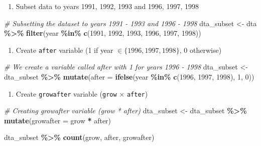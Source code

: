 \documentclass[
]{article}
\newenvironment{Shaded}{\begin{snugshade}}{\end{snugshade}}
\newcommand{\AttributeTok}[1]{\textcolor[rgb]{0.13,0.29,0.53}{#1}}
\newcommand{\CommentTok}[1]{\textcolor[rgb]{0.56,0.35,0.01}{\textit{#1}}}
\newcommand{\DecValTok}[1]{\textcolor[rgb]{0.00,0.00,0.81}{#1}}
\newcommand{\FunctionTok}[1]{\textcolor[rgb]{0.13,0.29,0.53}{\textbf{#1}}}
\newcommand{\NormalTok}[1]{#1}
\newcommand{\OtherTok}[1]{\textcolor[rgb]{0.56,0.35,0.01}{#1}}
\newcommand{\SpecialCharTok}[1]{\textcolor[rgb]{0.81,0.36,0.00}{\textbf{#1}}}
\providecommand{\tightlist}{%
  \setlength{\itemsep}{0pt}\setlength{\parskip}{0pt}}
\begin{document}
\begin{enumerate}
\def\labelenumi{\arabic{enumi}.}
\setcounter{enumi}{1}
\tightlist
\item
  Subset data to years 1991, 1992, 1993 and 1996, 1997, 1998
\end{enumerate}

\begin{Shaded}
\begin{Highlighting}[]
\CommentTok{\# Subsetting the dataset to years 1991 {-} 1993 and 1996 {-} 1998}
\NormalTok{dta\_subset }\OtherTok{\textless{}{-}}\NormalTok{ dta }\SpecialCharTok{\%\textgreater{}\%} 
  \FunctionTok{filter}\NormalTok{(year }\SpecialCharTok{\%in\%} \FunctionTok{c}\NormalTok{(}\DecValTok{1991}\NormalTok{, }\DecValTok{1992}\NormalTok{, }\DecValTok{1993}\NormalTok{, }\DecValTok{1996}\NormalTok{, }\DecValTok{1997}\NormalTok{, }\DecValTok{1998}\NormalTok{))}
\end{Highlighting}
\end{Shaded}

\begin{enumerate}
\def\labelenumi{\arabic{enumi}.}
\setcounter{enumi}{2}
\tightlist
\item
  Create \texttt{after} variable (1 if year
  \(\in \{1996, 1997, 1998\}\), 0 otherwise)
\end{enumerate}

\begin{Shaded}
\begin{Highlighting}[]
\CommentTok{\# We create a variable called after with 1 for years 1996 {-} 1998}
\NormalTok{dta\_subset }\OtherTok{\textless{}{-}}\NormalTok{ dta\_subset }\SpecialCharTok{\%\textgreater{}\%} 
  \FunctionTok{mutate}\NormalTok{(}\AttributeTok{after =} \FunctionTok{ifelse}\NormalTok{(year }\SpecialCharTok{\%in\%} \FunctionTok{c}\NormalTok{(}\DecValTok{1996}\NormalTok{, }\DecValTok{1997}\NormalTok{, }\DecValTok{1998}\NormalTok{), }\DecValTok{1}\NormalTok{, }\DecValTok{0}\NormalTok{))}
\end{Highlighting}
\end{Shaded}

\begin{enumerate}
\def\labelenumi{\arabic{enumi}.}
\setcounter{enumi}{3}
\tightlist
\item
  Create \texttt{growafter} variable (\texttt{grow} \(\times\)
  \texttt{after})
\end{enumerate}

\begin{Shaded}
\begin{Highlighting}[]
\CommentTok{\# Creating growafter variable (grow * after)}
\NormalTok{dta\_subset }\OtherTok{\textless{}{-}}\NormalTok{ dta\_subset }\SpecialCharTok{\%\textgreater{}\%} 
  \FunctionTok{mutate}\NormalTok{(}\AttributeTok{growafter =}\NormalTok{ grow }\SpecialCharTok{*}\NormalTok{ after)}

\NormalTok{dta\_subset }\SpecialCharTok{\%\textgreater{}\%} 
  \FunctionTok{count}\NormalTok{(grow, after, growafter)}
\end{Highlighting}
\end{Shaded}
\end{document}
